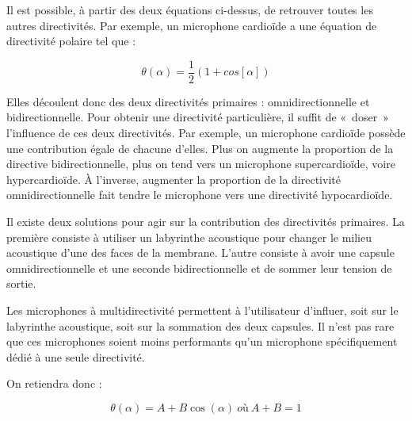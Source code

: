 \documentclass[
]{book}
\begin{document}
Il est possible, à partir des deux équations ci-dessus, de retrouver toutes les autres directivités. Par exemple, un microphone cardioïde a une équation de directivité polaire tel que :

\[ \theta(\alpha) = \frac{1}{2}(1 + cos[\alpha]) \]

Elles découlent donc des deux directivités primaires : omnidirectionnelle et bidirectionnelle. Pour obtenir une directivité particulière, il suffit de «~doser~» l'influence de ces deux directivités. Par exemple, un microphone cardioïde possède une contribution égale de chacune d'elles. Plus on augmente la proportion de la directive bidirectionnelle, plus on tend vers un microphone supercardioïde, voire hypercardioïde. À l'inverse, augmenter la proportion de la directivité omnidirectionnelle fait tendre le microphone vers une directivité hypocardioïde.

Il existe deux solutions pour agir sur la contribution des directivités primaires. La première consiste à utiliser un labyrinthe acoustique pour changer le milieu acoustique d'une des faces de la membrane. L'autre consiste à avoir une capsule omnidirectionnelle et une seconde bidirectionnelle et de sommer leur tension de sortie.

Les microphones à multidirectivité permettent à l'utilisateur d'influer, soit sur le labyrinthe acoustique, soit sur la sommation des deux capsules. Il n'est pas rare que ces microphones soient moins performants qu'un microphone spécifiquement dédié à une seule directivité.

On retiendra donc :

\[ \theta(\alpha) = A + B \cos (\alpha) \> où \> A + B = 1\]
\end{document}
